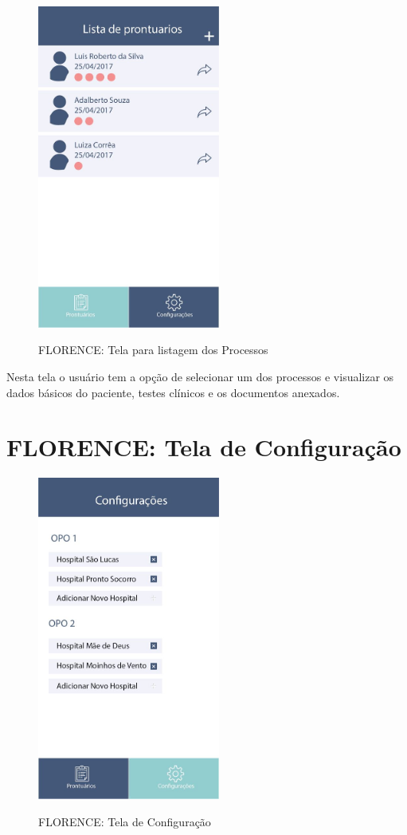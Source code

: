\documentclass[portuguese,oneside]{tcc}
\begin{document}
\begin{figure}[htp]
\centering
\caption{FLORENCE: Tela para listagem dos Processos}
\includegraphics[width=6cm]{app-list}
\label{fig:app-list}
\end{figure}

Nesta tela o usuário tem a opção de selecionar um dos processos e visualizar os dados básicos do paciente, testes clínicos e os documentos anexados.

\section{FLORENCE: Tela de Configuração}

\begin{figure}[htp]
\centering
\caption{FLORENCE: Tela de Configuração}
\includegraphics[width=6cm]{app-config}
\label{fig:app-config}
\end{figure}
\end{document}
